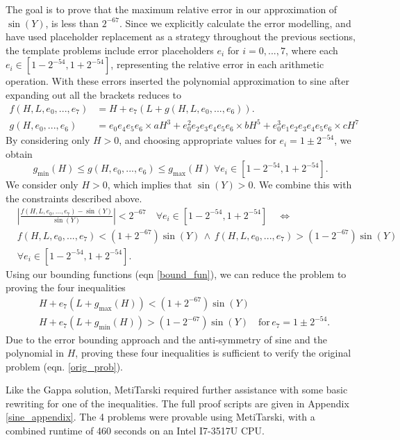 \documentclass{fac}
\begin{document}
The goal is to prove that the maximum relative error in our approximation of $\sin{(Y)}$, is less than $2^{-67}$. Since we explicitly calculate the error modelling, and have used placeholder replacement as a strategy throughout the previous sections, the template problems include error placeholders $e_i$ for $i=0,...,7$, where each $e_i \in [1-2^{-54},1+2^{-54}]$, representing the relative error in each arithmetic operation. With these errors inserted the polynomial approximation to sine after expanding out all the brackets reduces to
\begin{align*}
    f(H,L, e_0,..., e_7) &= H + e_7(L + g(H,L, e_0,..., e_6)).\\
    g(H, e_0,..., e_6) &= e_0e_4e_5e_6\times aH^3 + e_0^2e_2e_3e_4e_5e_6\times bH^5 + e_0^3e_1e_2e_3e_4e_5e_6\times cH^7
\end{align*}
By considering only $H>0$, and choosing appropriate values for $e_i=1\pm 2^{-54}$, we obtain 
\begin{equation} \label{bound_fun}
g_{\textrm{min}}(H) \leq g(H,e_0,...,e_6) \leq g_{\textrm{max}}(H) \; \forall e_i \in [1-2^{-54},1+2^{-54}].
\end{equation}
We consider only $H>0$, which implies that $\sin{(Y)}>0$. We combine this with the constraints described above. 
\begin{align}
    &\left|\frac{f(H,L, e_0,...,e_7)-\sin{(Y)}}{\sin{(Y)}}\right|<2^{-67} \quad \forall e_i \in [1-2^{-54},1+2^{-54}] \label{orig_prob} \quad \Leftrightarrow \\
    & f(H,L,e_0,...,e_7) < (1+2^{-67}) \sin{(Y)} \, \land \, f(H,L,e_0,...,e_7) > (1-2^{-67}) \sin{(Y)} 
    \\
    & \forall e_i \in [1-2^{-54},1+2^{-54}].
\end{align}
Using our bounding functions (eqn \ref{bound_fun}), we can reduce the problem to proving the four inequalities
\begin{align}
    &H + e_7(L+g_{\textrm{max}}(H)) < (1+2^{-67}) \sin{(Y)}\label{upper_bound} \\
    &H + e_7(L+g_{\textrm{min}}(H)) > (1-2^{-67}) \sin{(Y)}\label{lower_bound} \quad \textrm{for}\,  e_7=1\pm2^{-54}.
\end{align}
Due to the error bounding approach and the anti-symmetry of sine and the polynomial in $H$, proving these four inequalities is sufficient to verify the original problem (eqn. \ref{orig_prob}).

Like the Gappa solution, MetiTarski required further assistance with some basic rewriting for one of the inequalities. The full proof scripts are given in Appendix \ref{sine_appendix}. The 4 problems were provable using MetiTarski, with a combined runtime of 460 seconds on an Intel I7-3517U CPU.
\end{document}
